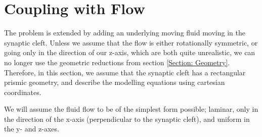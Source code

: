 \documentclass{article}
\begin{document}
\section{Coupling with Flow}
The problem is extended by adding an underlying moving fluid moving in the synaptic cleft. Unless we assume that the flow is either rotationally symmetric, or going only in the direction of our z-axis, which are both quite unrealistic, we can no longer use the geometric reductions from section \ref{Section: Geometry}. Therefore, in this section, we assume that the synaptic cleft has a rectangular prismic geometry, and describe the modelling equations using cartesian coordinates.

We will assume the fluid flow to be of the simplest form possible; laminar, only in the direction of the x-axis (perpendicular to the synaptic cleft), and uniform in the y- and z-axes.
\end{document}
